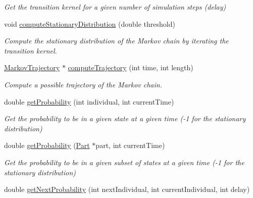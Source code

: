 \begin{DoxyCompactItemize}
\begin{DoxyCompactList}\small\item\em Get the transition kernel for a given number of simulation steps (delay) \end{DoxyCompactList}\item 
void \hyperlink{class_markov_process_a77be24a3ccec6e19ba922f932d19e0fa}{compute\-Stationary\-Distribution} (double threshold)
\begin{DoxyCompactList}\small\item\em Compute the stationary distribution of the Markov chain by iterating the transition kernel. \end{DoxyCompactList}\item 
\hyperlink{class_markov_trajectory}{Markov\-Trajectory} $\ast$ \hyperlink{class_markov_process_aa0cb98a6e0fde978d037041e40ec78da}{compute\-Trajectory} (int time, int length)
\begin{DoxyCompactList}\small\item\em Compute a possible trajectory of the Markov chain. \end{DoxyCompactList}\item 
\hypertarget{class_markov_process_ad49d1ff46d5bf94e45a8b218b676c203}{double \hyperlink{class_markov_process_ad49d1ff46d5bf94e45a8b218b676c203}{get\-Probability} (int individual, int current\-Time)}\label{class_markov_process_ad49d1ff46d5bf94e45a8b218b676c203}

\begin{DoxyCompactList}\small\item\em Get the probability to be in a given state at a given time (-\/1 for the stationary distribution) \end{DoxyCompactList}\item 
\hypertarget{class_markov_process_afe80afb9c456631a9168c762058d3cd2}{double \hyperlink{class_markov_process_afe80afb9c456631a9168c762058d3cd2}{get\-Probability} (\hyperlink{class_part}{Part} $\ast$part, int current\-Time)}\label{class_markov_process_afe80afb9c456631a9168c762058d3cd2}

\begin{DoxyCompactList}\small\item\em Get the probability to be in a given subset of states at a given time (-\/1 for the stationary distribution) \end{DoxyCompactList}\item 
\hypertarget{class_markov_process_ab17f4ae9fa56c009553a5d50e899a84b}{double \hyperlink{class_markov_process_ab17f4ae9fa56c009553a5d50e899a84b}{get\-Next\-Probability} (int next\-Individual, int current\-Individual, int delay)}\label{class_markov_process_ab17f4ae9fa56c009553a5d50e899a84b}


\end{DoxyCompactItemize}
